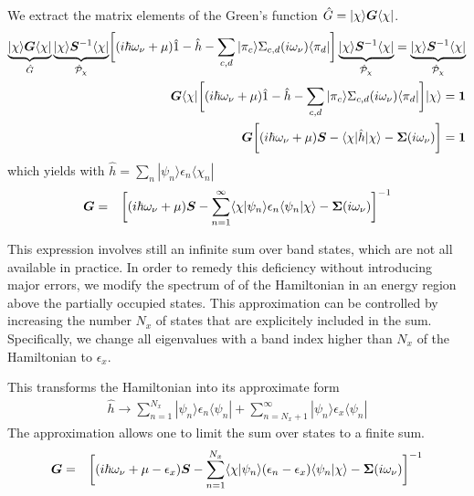 \documentclass[11pt,a4paper]{report}
\begin{document}
We extract the matrix elements of the Green's function
$\hat{G}=|\chi\rangle\bm{G}\langle\chi|$.
\begin{eqnarray}
\underbrace{|\chi\rangle \bm{G}\langle\chi|}_{\hat{G}}
\underbrace{|\chi\rangle \bm{S}^{-1}\langle\chi|}_{\hat{\mathcal{P}}_\chi}
\biggl[(i\hbar\omega_\nu+\mu)\hat{1}-\hat{h}-\sum_{c,d}|\pi_c\rangle\Sigma_{c,d}(i\omega_\nu)\langle\pi_d|\biggr]
\underbrace{|\chi\rangle \bm{S}^{-1}\langle\chi|}_{\hat{\mathcal{P}}_\chi}
=\underbrace{|\chi\rangle \bm{S}^{-1}\langle\chi|}_{\hat{\mathcal{P}}_\chi}
\nonumber\\
\bm{G}\langle\chi|
\biggl[(i\hbar\omega_\nu+\mu)\hat{1}-\hat{h}-\sum_{c,d}|\pi_c\rangle\Sigma_{c,d}(i\omega_\nu)\langle\pi_d|\biggr]
|\chi\rangle =\bm{1}
\nonumber\\
\bm{G}
\biggl[(i\hbar\omega_\nu+\mu)\bm{S}-\langle\chi|\hat{h}|\chi\rangle-\bm{\Sigma}(i\omega_\nu)\biggr]
=\bm{1}
\nonumber\\
\end{eqnarray}
which yields with $\hat{h}=\sum_n|\psi_n\rangle\epsilon_n\langle\chi_n|$
\begin{eqnarray}
\bm{G}&=&
\biggl[(i\hbar\omega_\nu+\mu)\bm{S}
-\sum_{n=1}^\infty
\langle\chi|\psi_n\rangle \epsilon_n\langle\psi_n|\chi\rangle-\bm{\Sigma}(i\omega_\nu)\biggr]^{-1}
\end{eqnarray}

This expression involves still an infinite sum over band states, which
are not all available in practice. In order to remedy this deficiency
without introducing major errors, we modify the spectrum of of the
Hamiltonian in an energy region above the partially occupied states.
This approximation can be controlled by increasing the number $N_x$ of
states that are explicitely included in the sum. Specifically, we
change all eigenvalues with a band index higher than $N_x$ of the
Hamiltonian to $\epsilon_x$.

This transforms the Hamiltonian into its approximate form
\begin{eqnarray}
\hat{h}\rightarrow\sum_{n=1}^{N_x}|\psi_n\rangle \epsilon_n\langle\psi_n|
+\sum_{n=N_x+1}^\infty|\psi_n\rangle \epsilon_x\langle\psi_n|
\end{eqnarray}
The approximation allows one to limit the sum over states to a finite sum.
\begin{eqnarray}
\bm{G}&=&
\biggl[(i\hbar\omega_\nu+\mu-\epsilon_x)\bm{S}-\sum_{n=1}^{N_x}
\langle\chi|\psi_n\rangle (\epsilon_n-\epsilon_x)\langle\psi_n|\chi\rangle-\bm{\Sigma}(i\omega_\nu)\biggr]^{-1}
\end{eqnarray}
\end{document}

